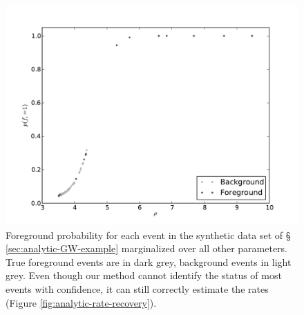 \documentclass[aps,prd]{revtex4-1}
\begin{document}
\begin{figure}
  \includegraphics[width=\columnwidth]{pfore}
  \caption{\label{fig:analytic-rate-foreground-probs} Foreground
    probability for each event in the synthetic data set of \S
    \ref{sec:analytic-GW-example} marginalized over all other
    parameters.  True foreground events are in dark grey, background
    events in light grey.  Even though our method cannot identify the
    status of most events with confidence, it can still correctly
    estimate the rates (Figure \ref{fig:analytic-rate-recovery}).}
\end{figure}
\end{document}
